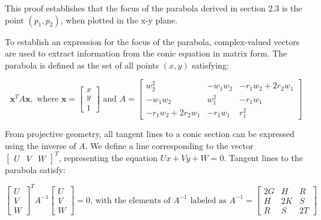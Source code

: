 \documentclass[11pt]{article}
\newcommand{\bs}[1]{\boldsymbol{#1}} %
\begin{document}
        This proof establishes that the focus of the parabola derived in section 2.3 is the point $(p_1,p_2)$, when plotted in the x-y plane.
        
        To establish an expression for the focus of the parabola, complex-valued vectors are used to extract information from the conic equation in matrix form. The parabola is defined as the set of all points $(x,y)$ satisfying: 
    
        \setcounter{equation}{28}
        \begin{equation}
            \bs{x}^TA\bs{x}, \text{ where } \bs{x} = \begin{bmatrix} x \\ y \\ 1 \end{bmatrix} \text{ and } 
            A = \begin{bmatrix} w_2^2               & -w_1w_2   & -r_1w_2 + 2r_2w_1 \\
                                -w_1w_2             & w_1^2     & -r_1w_1 \\
                                -r_1w_2 + 2r_2w_1   & -r_1w_1   & r_1^2\end{bmatrix}
            \label{eq:Eq29}
        \end{equation}
    
        From projective geometry, all tangent lines to a conic section can be expressed using the inverse of $A$. We define a line corresponding to the vector $\begin{bmatrix}U&V&W\end{bmatrix}^T$, representing the equation $Ux + Vy + W = 0$. Tangent lines to the parabola satisfy: 

        \setcounter{equation}{53}
        \begin{equation}
            \begin{bmatrix} U \\ V \\ W \end{bmatrix}^T A^{-1} \begin{bmatrix} U \\ V \\ W \end{bmatrix} = 0
            \text{, with the elements of } A^{-1} \text{ labeled as } A^{-1} = 
            \begin{bmatrix} 2G & H & R \\ 
                            H & 2K & S \\ 
                            R & S  & 2T\end{bmatrix}
            \label{eq:Eq54}
        \end{equation}
    
\end{document}
